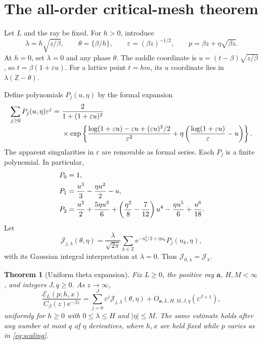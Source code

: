\documentclass[11pt,a4paper]{article}
\numberwithin{equation}{section}
\newtheorem{theorem}{Theorem}[section]
\theoremstyle{definition}\newtheorem{definition}[theorem]{Definition}
\theoremstyle{remark}\newtheorem{remark}[theorem]{Remark}
\newcommand{\e}{\mathrm e}
\newcommand{\Z}{\mathbb Z}
\newcommand{\avec}{\boldsymbol a}
\newcommand{\eps}{\varepsilon}
\newcommand{\calE}{\mathcal E}
\newcommand{\calJ}{\mathcal J}
\begin{document}
\section{The all-order critical-mesh theorem}
\label{sec:allorder}

Let $L$ and the ray be fixed. For $h>0$, introduce
\begin{equation}
 \lambda=h\sqrt{z/\beta},\qquad
 \theta=\{\beta/h\},\qquad
 \eps=(\beta z)^{-1/2},\qquad
 p=\beta z+\eta\sqrt{\beta z}.
 \label{eq:scaling}
\end{equation}
At $h=0$, set $\lambda=0$ and any phase $\theta$. The saddle coordinate is
$u=(t-\beta)\sqrt{z/\beta}$, so $t=\beta(1+\eps u)$.
For a lattice point $t=hm$, its $u$ coordinate lies in
$\lambda(\Z-\theta)$.

Define polynomials $P_j(u,\eta)$ by the formal expansion
\begin{align}
 \sum_{j\ge0}P_j(u,\eta)\eps^j
 ={}&\frac{2}{1+(1+\eps u)^2}\notag\\[-2pt]
 &\times\exp\left\{
 \frac{\log(1+\eps u)-\eps u+(\eps u)^2/2}{\eps^2}
 +\eta\left(\frac{\log(1+\eps u)}\eps-u\right)\right\}.
 \label{eq:Pgen}
\end{align}
The apparent singularities in $\eps$ are removable as formal series.
Each $P_j$ is a finite polynomial. In particular,
\begin{align}
 P_0={}&1,\notag\\
 P_1={}&\frac{u^3}{3}-\frac{\eta u^2}{2}-u,\label{eq:P1}\\
 P_2={}&\frac{u^2}{2}+\frac{5\eta u^3}{6}
 +\left(\frac{\eta^2}{8}-\frac7{12}\right)u^4
 -\frac{\eta u^5}{6}+\frac{u^6}{18}.
 \label{eq:P2}
\end{align}
Let
\begin{equation}
 \calJ_{j,\lambda}(\theta,\eta)
 =\frac{\lambda}{\sqrt{2\pi}}
 \sum_{k\in\Z}\e^{-u_k^2/2+\eta u_k}P_j(u_k,\eta),
 \label{eq:Jj}
\end{equation}
with its Gaussian integral interpretation at $\lambda=0$.
Thus $\calJ_{0,\lambda}=\calJ_\lambda$.

\begin{theorem}[Uniform theta expansion]
\label{thm:theta}
Fix $L\ge0$, the positive ray $\avec$, $H,M<\infty$, and integers $J,q\ge0$.
As $z\to\infty$,
\begin{equation}
 \frac{\calE_L(p;h,x)}{C_\beta(z)\e^{-\beta z}}
 =\sum_{j=0}^{J}\eps^j\calJ_{j,\lambda}(\theta,\eta)
       +O_{\avec,L,H,M,J,q}(\eps^{J+1}),
 \label{eq:allorder}
\end{equation}
uniformly for $h\ge0$ with $0\le\lambda\le H$ and $|\eta|\le M$.
The same estimate holds after any number at most $q$ of $\eta$ derivatives,
where $h,x$ are held fixed while $p$ varies as in \eqref{eq:scaling}.
\end{theorem}
\end{document}
